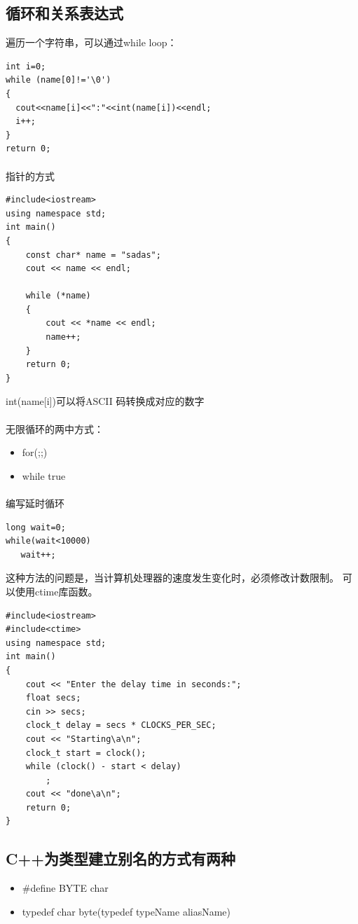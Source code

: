 \documentclass[a4paper,12pt]{article}
\begin{document}
\begin{spacing}{2}
\section{循环和关系表达式}
遍历一个字符串，可以通过while loop：
\begin{lstlisting}
int i=0;
while (name[0]!='\0')
{
  cout<<name[i]<<":"<<int(name[i])<<endl;
  i++;
}
return 0;
\end{lstlisting}
\paragraph{ }指针的方式
\begin{lstlisting}
#include<iostream>
using namespace std;
int main()
{
    const char* name = "sadas";
	cout << name << endl;
	
	while (*name)
	{
		cout << *name << endl;
		name++;
	}
	return 0;
}
\end{lstlisting}
int(name[i])可以将ASCII 码转换成对应的数字
\paragraph{}无限循环的两中方式：
\begin{itemize}
\item for(;;)
\item while true
\end{itemize}
\paragraph{ }编写延时循环
\begin{lstlisting}
long wait=0;
while(wait<10000)
   wait++;
\end{lstlisting}
这种方法的问题是，当计算机处理器的速度发生变化时，必须修改计数限制。
可以使用ctime库函数。
\begin{lstlisting}
#include<iostream>
#include<ctime>
using namespace std;
int main()
{
	cout << "Enter the delay time in seconds:";
	float secs;
	cin >> secs;
	clock_t delay = secs * CLOCKS_PER_SEC;
	cout << "Starting\a\n";
	clock_t start = clock();
	while (clock() - start < delay)
		;
	cout << "done\a\n";
	return 0;
}
\end{lstlisting}
\subsection{C++为类型建立别名的方式有两种}
\begin{itemize}
\item $\#$define BYTE char
\item typedef char byte(typedef typeName aliasName)
\end{itemize}

\end{spacing}
\end{document}
